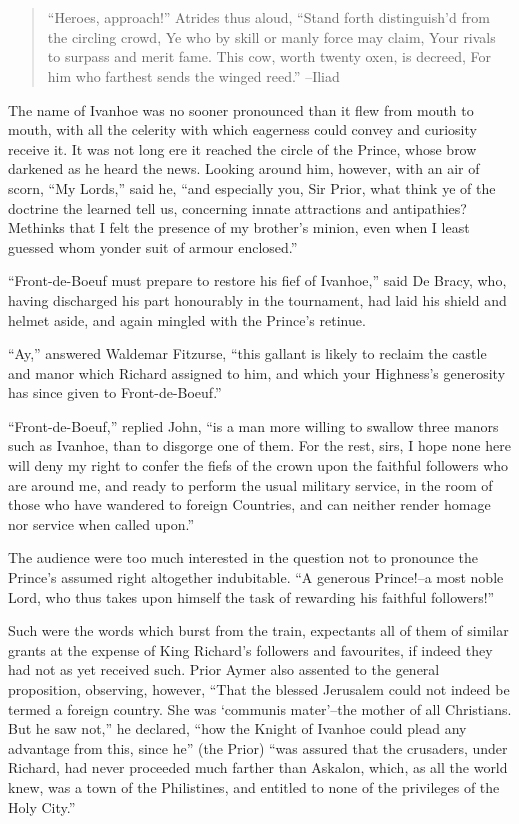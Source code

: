 \chapter{}

\begin{quote}
``Heroes, approach!'' Atrides thus aloud,
``Stand forth distinguish'd from the circling crowd,
Ye who by skill or manly force may claim,
Your rivals to surpass and merit fame.
This cow, worth twenty oxen, is decreed,
For him who farthest sends the winged reed.''
--Iliad
\end{quote}

The name of Ivanhoe was no sooner pronounced than it flew from mouth to
mouth, with all the celerity with which eagerness could convey and
curiosity receive it. It was not long ere it reached the circle of the
Prince, whose brow darkened as he heard the news. Looking around him,
however, with an air of scorn, ``My Lords,'' said he, ``and especially
you, Sir Prior, what think ye of the doctrine the learned tell us,
concerning innate attractions and antipathies? Methinks that I felt the
presence of my brother's minion, even when I least guessed whom yonder
suit of armour enclosed.''

``Front-de-Boeuf must prepare to restore his fief of Ivanhoe,'' said De
Bracy, who, having discharged his part honourably in the tournament, had
laid his shield and helmet aside, and again mingled with the Prince's
retinue.

``Ay,'' answered Waldemar Fitzurse, ``this gallant is likely to reclaim
the castle and manor which Richard assigned to him, and which your
Highness's generosity has since given to Front-de-Boeuf.''

``Front-de-Boeuf,'' replied John, ``is a man more willing to swallow
three manors such as Ivanhoe, than to disgorge one of them. For the
rest, sirs, I hope none here will deny my right to confer the fiefs of
the crown upon the faithful followers who are around me, and ready to
perform the usual military service, in the room of those who have
wandered to foreign Countries, and can neither render homage nor service
when called upon.''

The audience were too much interested in the question not to pronounce
the Prince's assumed right altogether indubitable. ``A generous
Prince!--a most noble Lord, who thus takes upon himself the task of
rewarding his faithful followers!''

Such were the words which burst from the train, expectants all of them
of similar grants at the expense of King Richard's followers and
favourites, if indeed they had not as yet received such. Prior Aymer
also assented to the general proposition, observing, however, ``That the
blessed Jerusalem could not indeed be termed a foreign country. She was
`communis mater'--the mother of all Christians. But he saw not,'' he
declared, ``how the Knight of Ivanhoe could plead any advantage from
this, since he'' (the Prior) ``was assured that the crusaders, under
Richard, had never proceeded much farther than Askalon, which, as all
the world knew, was a town of the Philistines, and entitled to none of
the privileges of the Holy City.''

